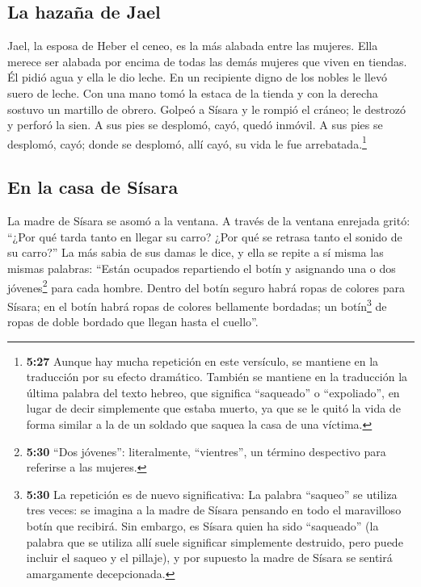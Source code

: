\hypertarget{la-hazauxf1a-de-jael}{%
\subsection{La hazaña de Jael}\label{la-hazauxf1a-de-jael}}

 Jael, la esposa de Heber el ceneo, es la más alabada
entre las mujeres. Ella merece ser alabada por encima de todas las demás
mujeres que viven en tiendas.  Él pidió agua y ella le
dio leche. En un recipiente digno de los nobles le llevó suero de leche.
 Con una mano tomó la estaca de la tienda y con la
derecha sostuvo un martillo de obrero. Golpeó a Sísara y le rompió el
cráneo; le destrozó y perforó la sien.  A sus pies se
desplomó, cayó, quedó inmóvil. A sus pies se desplomó, cayó; donde se
desplomó, allí cayó, su vida le fue arrebatada.\footnote{\textbf{5:27}
  Aunque hay mucha repetición en este versículo, se mantiene en la
  traducción por su efecto dramático. También se mantiene en la
  traducción la última palabra del texto hebreo, que significa
  ``saqueado'' o ``expoliado'', en lugar de decir simplemente que estaba
  muerto, ya que se le quitó la vida de forma similar a la de un soldado
  que saquea la casa de una víctima.}

\hypertarget{en-la-casa-de-suxedsara}{%
\subsection{En la casa de Sísara}\label{en-la-casa-de-suxedsara}}

 La madre de Sísara se asomó a la ventana. A través de la
ventana enrejada gritó: ``¿Por qué tarda tanto en llegar su carro? ¿Por
qué se retrasa tanto el sonido de su carro?''  La más
sabia de sus damas le dice, y ella se repite a sí misma las mismas
palabras:  ``Están ocupados repartiendo el botín y
asignando una o dos jóvenes\footnote{\textbf{5:30} ``Dos jóvenes'':
  literalmente, ``vientres'', un término despectivo para referirse a las
  mujeres.} para cada hombre. Dentro del botín seguro habrá ropas de
colores para Sísara; en el botín habrá ropas de colores bellamente
bordadas; un botín\footnote{\textbf{5:30} La repetición es de nuevo
  significativa: La palabra ``saqueo'' se utiliza tres veces: se imagina
  a la madre de Sísara pensando en todo el maravilloso botín que
  recibirá. Sin embargo, es Sísara quien ha sido ``saqueado'' (la
  palabra que se utiliza allí suele significar simplemente destruido,
  pero puede incluir el saqueo y el pillaje), y por supuesto la madre de
  Sísara se sentirá amargamente decepcionada.} de ropas de doble bordado
que llegan hasta el cuello''.

